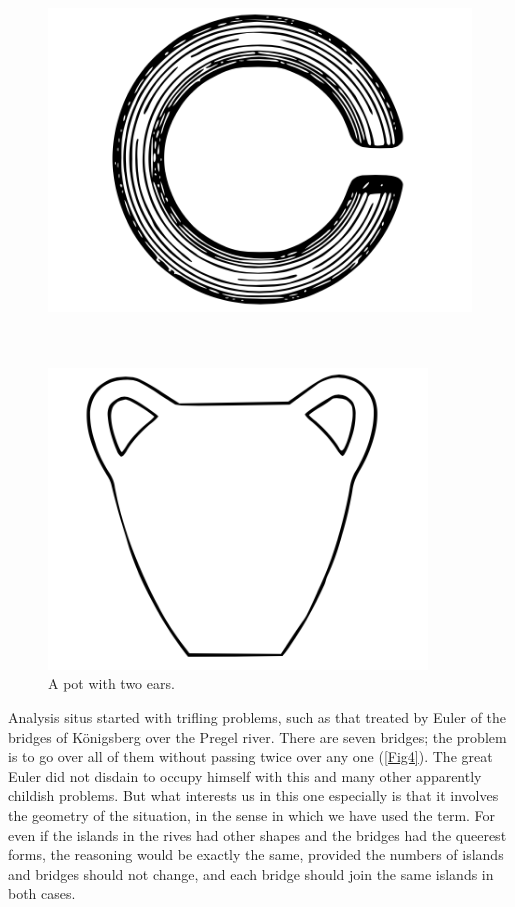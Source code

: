 \documentclass[12pt,oneside]{book}
\begin{document}
\begin{figure}
    \centering
    \includegraphics[height=10cm]{Fig2.png}
    \caption{}
    \label{Fig2}
\end{figure}

\begin{figure}
    \centering
    \includegraphics[height=8cm]{Fig3.png}
    \caption{A pot with two ears.}
    \label{Fig3}
\end{figure}

Analysis situs started with trifling problems, such as that treated by Euler of the bridges of K\"onigsberg over the Pregel river. There are seven bridges; the problem is to go over all of them without passing twice over any one (\ref{Fig4}). The great Euler did not disdain to occupy himself with this and many other apparently childish problems. But what interests us in this one especially is that it involves the geometry of the situation, in the sense in which we have used the term. For even if the islands in the rives had other shapes and the bridges had the queerest forms, the reasoning would be exactly the same, provided the numbers of islands and bridges should not change, and each bridge should join the same islands in both cases. \par
\end{document}
